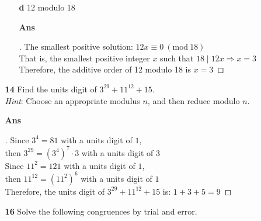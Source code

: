\documentclass[paper=usletter, fontsize=12pt]{article}
\newcommand{\Mod}[1]{\ (\mathrm{mod}\ #1)}
\begin{document}
\begin{itemize}
\begin{itemize}
\begin{itemize}
                \item[\textbf{d}] 12 modulo 18
                \item[\textbf{Ans}]
                \begin{proof}[\unskip\nopunct]
                    The smallest positive solution: $12x \equiv 0 \Mod{18}$\\
                    That is, the smallest positive integer $x$ such that $18
                    \mid 12x \Rightarrow x=3$\\ Therefore, the additive order
                    of 12 modulo 18 is $x = 3$ \qedhere
                \end{proof}
                \vspace{0.2in}

            \end{itemize}

            \item[\textbf{14}] Find the units digit of $3^{29}+11^{12}+15$.\\
            \textit{Hint}: Choose an appropriate modulus $n$, and then reduce
            modulo $n$.
            \item[\textbf{Ans}]
            \begin{proof}[\unskip\nopunct]
                Since $3^4=81$ with a units digit of $1$,\\
                then $3^{29}=(3^{4})^{7} \cdot 3$ with a units digit of $3$\\

                Since $11^2=121$ with a units digit of $1$,\\
                then $11^{12}=(11^{2})^{6}$ with a units digit of $1$\\

                Therefore, the units digit of $3^{29}+11^{12}+15$ is: $1 + 3 + 5 = 9$ \qedhere
            \end{proof}
            \vspace{0.2in}

            \item[\textbf{16}] Solve the following congruences by trial and
            error.
            \begin{itemize}


\end{itemize}
\end{itemize}
\end{itemize}
\end{document}
